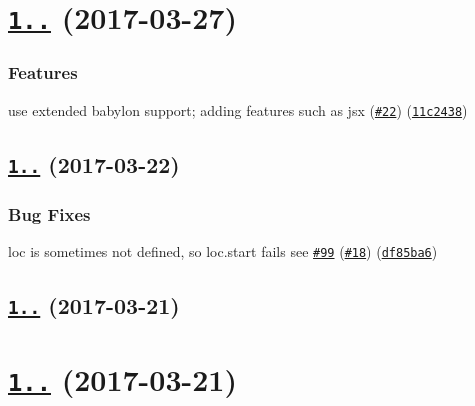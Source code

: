 \label{_1.7.0}%
 \section*{\href{https://github.com/istanbuljs/istanbul-lib-instrument/compare/istanbul-lib-instrument@1.6.2...istanbul-lib-instrument@1.7.0}{\tt 1..} (2017-\/03-\/27)}

\subsubsection*{Features}


\begin{DoxyItemize}
\item use extended babylon support; adding features such as jsx (\href{https://github.com/istanbuljs/istanbuljs/issues/22}{\tt \#22}) (\href{https://github.com/istanbuljs/istanbul-lib-instrument/commit/11c2438}{\tt 11c2438})
\end{DoxyItemize}

\label{_1.6.2}%
 \subsection*{\href{https://github.com/istanbuljs/istanbul-lib-instrument/compare/istanbul-lib-instrument@1.6.1...istanbul-lib-instrument@1.6.2}{\tt 1..} (2017-\/03-\/22)}

\subsubsection*{Bug Fixes}


\begin{DoxyItemize}
\item loc is sometimes not defined, so loc.\+start fails see \href{https://github.com/istanbuljs/istanbuljs/issues/99}{\tt \#99} (\href{https://github.com/istanbuljs/istanbuljs/issues/18}{\tt \#18}) (\href{https://github.com/istanbuljs/istanbul-lib-instrument/commit/df85ba6}{\tt df85ba6})
\end{DoxyItemize}

\label{_1.6.1}%
 \subsection*{\href{https://github.com/istanbuljs/istanbul-lib-instrument/compare/istanbul-lib-instrument@1.6.0...istanbul-lib-instrument@1.6.1}{\tt 1..} (2017-\/03-\/21)}

\label{_1.6.0}%
 \section*{\href{https://github.com/istanbuljs/istanbul-lib-instrument/compare/istanbul-lib-instrument@1.4.2...istanbul-lib-instrument@1.6.0}{\tt 1..} (2017-\/03-\/21)}

